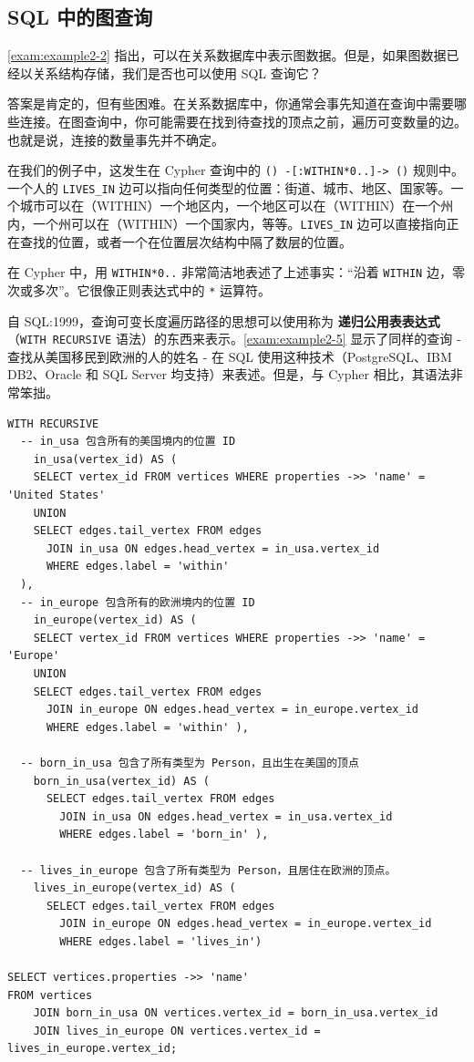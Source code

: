 \subsection{SQL 中的图查询}

\autoref{exam:example2-2} 指出，可以在关系数据库中表示图数据。但是，如果图数据已经以关系结构存储，我们是否也可以使用 SQL 查询它？

答案是肯定的，但有些困难。在关系数据库中，你通常会事先知道在查询中需要哪些连接。在图查询中，你可能需要在找到待查找的顶点之前，遍历可变数量的边。也就是说，连接的数量事先并不确定。

在我们的例子中，这发生在 Cypher 查询中的 \texttt{() -[:WITHIN*0..]-> ()} 规则中。一个人的 \texttt{LIVES\_IN} 边可以指向任何类型的位置：街道、城市、地区、国家等。一个城市可以在（WITHIN）一个地区内，一个地区可以在（WITHIN）在一个州内，一个州可以在（WITHIN）一个国家内，等等。\texttt{LIVES\_IN} 边可以直接指向正在查找的位置，或者一个在位置层次结构中隔了数层的位置。

在 Cypher 中，用 \texttt{WITHIN*0..} 非常简洁地表述了上述事实：“沿着 \texttt{WITHIN} 边，零次或多次”。它很像正则表达式中的 \texttt{*} 运算符。

自 SQL:1999，查询可变长度遍历路径的思想可以使用称为 \textbf{递归公用表表达式}（\texttt{WITH\ RECURSIVE} 语法）的东西来表示。\autoref{exam:example2-5} 显示了同样的查询 - 查找从美国移民到欧洲的人的姓名 - 在 SQL 使用这种技术（PostgreSQL、IBM DB2、Oracle 和 SQL Server 均支持）来表述。但是，与 Cypher 相比，其语法非常笨拙。

\label{exam:example2-5}
\begin{lstlisting}[caption={与示例 2-4 同样的查询，在 SQL 中使用递归公用表表达式表示}]
WITH RECURSIVE
  -- in_usa 包含所有的美国境内的位置 ID
    in_usa(vertex_id) AS (
    SELECT vertex_id FROM vertices WHERE properties ->> 'name' = 'United States'
    UNION
    SELECT edges.tail_vertex FROM edges
      JOIN in_usa ON edges.head_vertex = in_usa.vertex_id
      WHERE edges.label = 'within'
  ),
  -- in_europe 包含所有的欧洲境内的位置 ID
    in_europe(vertex_id) AS (
    SELECT vertex_id FROM vertices WHERE properties ->> 'name' = 'Europe'
    UNION
    SELECT edges.tail_vertex FROM edges
      JOIN in_europe ON edges.head_vertex = in_europe.vertex_id
      WHERE edges.label = 'within' ),

  -- born_in_usa 包含了所有类型为 Person，且出生在美国的顶点
    born_in_usa(vertex_id) AS (
      SELECT edges.tail_vertex FROM edges
        JOIN in_usa ON edges.head_vertex = in_usa.vertex_id
        WHERE edges.label = 'born_in' ),

  -- lives_in_europe 包含了所有类型为 Person，且居住在欧洲的顶点。
    lives_in_europe(vertex_id) AS (
      SELECT edges.tail_vertex FROM edges
        JOIN in_europe ON edges.head_vertex = in_europe.vertex_id
        WHERE edges.label = 'lives_in')

SELECT vertices.properties ->> 'name'
FROM vertices
    JOIN born_in_usa ON vertices.vertex_id = born_in_usa.vertex_id
    JOIN lives_in_europe ON vertices.vertex_id = lives_in_europe.vertex_id;
\end{lstlisting}

